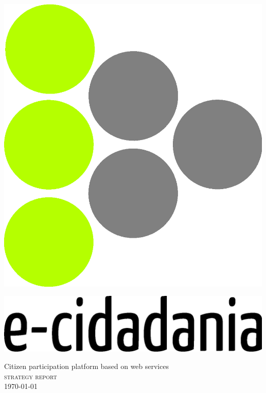 \documentclass{article}
\begin{document}
\begin{titlepage}

\begin{flushright}
\includegraphics[scale=0.4]{../images/logo_ecidadania.eps}\\
\end{flushright}

\begin{flushleft}
\includegraphics[scale=0.55]{../images/logo_name.eps}\\
\end{flushleft}

\begin{center}

\large Citizen participation platform based on web services\\[0.3cm]

\textsc{\Large strategy report}\\[1cm]
{\normalsize \today}


\end{center}
\end{titlepage}
\end{document}

